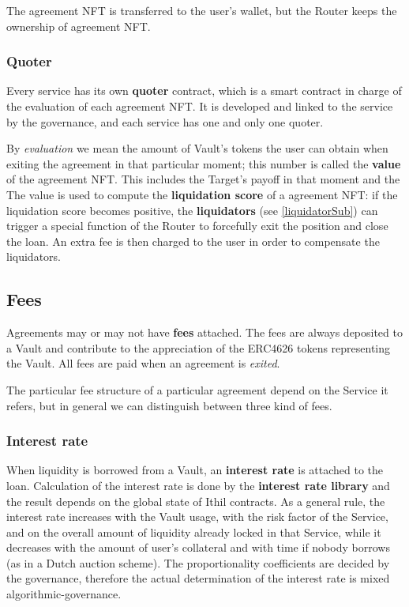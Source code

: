 \documentclass[a4paper,10 pt]{article}
\theoremstyle{definition}
\begin{document}
The agreement NFT is transferred to the user's wallet, but the Router keeps the ownership of agreement NFT.

\subsubsection{Quoter}\label{quoterSubSub}
Every service has its own {\bf quoter} contract, which is a smart contract in charge of the evaluation of each agreement NFT. It is developed and linked to the service by the governance, and each service has one and only one quoter.

By {\it evaluation} we mean the amount of Vault's tokens the user can obtain when exiting the agreement in that particular moment; this number is called the {\bf value} of the agreement NFT. This includes the Target's payoff in that moment and the  The value is used to compute the {\bf liquidation score} of a agreement NFT: if the liquidation score becomes positive, the {\bf liquidators} (see \ref{liquidatorSub}) can trigger a special function of the Router to forcefully exit the position and close the loan. An extra fee is then charged to the user in order to compensate the liquidators.

\subsection{Fees}\label{feeSub}

Agreements may or may not have {\bf fees} attached. The fees are always deposited to a Vault and contribute to the appreciation of the ERC4626 tokens representing the Vault.  All fees are paid when an agreement is {\it exited}.

The particular fee structure of a particular agreement depend on the Service it refers, but in general we can distinguish between three kind of fees.


\subsubsection{Interest rate}\label{interestRateSubSub}
When liquidity is borrowed from a Vault, an {\bf interest rate} is attached to the loan. Calculation of the interest rate is done by the {\bf interest rate library} and the result depends on the global state of Ithil contracts. As a general rule, the interest rate increases with the Vault usage, with the risk factor of the Service, and on the overall amount of liquidity already locked in that Service, while it decreases with the amount of user's collateral and with time if nobody borrows (as in a Dutch auction scheme). The proportionality coefficients are decided by the governance, therefore the actual determination of the interest rate is mixed algorithmic-governance.
\end{document}
